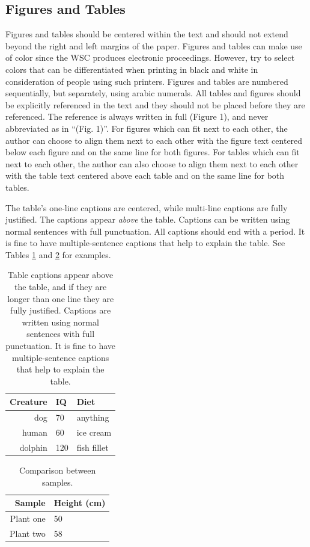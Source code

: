 \documentclass{wscpaperproc}
\theoremstyle{wsc}
\begin{document}
\subsection{Figures and Tables}
\label{sec:graphics}
Figures and tables should be centered within the text and should not extend beyond the right and left margins of the paper.
Figures and tables can make use of color since the WSC produces electronic proceedings.
However, try to select colors that can be differentiated when printing in black and white in consideration of people using such printers. Figures and tables are numbered sequentially, but separately, using arabic numerals.
All tables and figures should be explicitly referenced in the text and they should not be placed before they are referenced.
The reference is always written in full (Figure 1), and never abbreviated as in ``(Fig. 1)''.
For figures which can fit next to each other, the author can choose to align them next to each other with the figure text centered below each figure and on the same line for both figures. For tables which can fit next to each other, the author can also choose to align them next to each other with the table text centered above each table and on the same line for both tables.

The table's one-line captions are centered, while multi-line captions are fully justified.
The captions appear {\em above} the table.
Captions can be written using normal sentences with full punctuation. All captions should end with a period. It is fine to have multiple-sentence captions that help to explain the table.
See Tables \ref{tab: first} and \ref{tab: second} for examples.

\begin{table}[htb]
\centering
\caption{Table captions appear above the table, and if they are longer than one line they are fully justified. Captions are written using normal sentences with full punctuation. It is fine to have multiple-sentence captions that help to explain the table.\label{tab: first}}
\begin{tabular}{rll}
\hline
Creature & IQ & Diet\\ \hline
dog & 70 & anything\\
human & 60 & ice cream \\
dolphin & 120 & fish fillet\\
\hline
\end{tabular}
\end{table}

\begin{table}[htb]
\centering
\caption{Comparison between samples.\label{tab: second}}
\begin{tabular}{|r|l|}
\hline
Sample & Height (cm) \\ \hline
Plant one & 50 \\ \hline
Plant two & 58 \\
\hline
\end{tabular}
\end{table}
\end{document}
